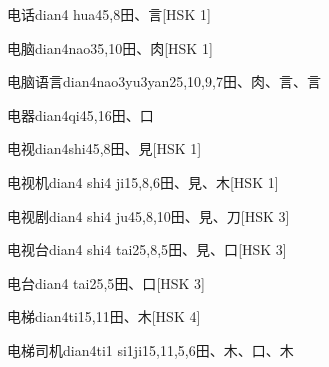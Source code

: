 \begin{entry}{电话}{dian4 hua4}{5,8}{⽥、⾔}[HSK 1]
\end{entry}

\begin{entry}{电脑}{dian4nao3}{5,10}{⽥、⾁}[HSK 1]
\end{entry}

\begin{entry}{电脑语言}{dian4nao3yu3yan2}{5,10,9,7}{⽥、⾁、⾔、⾔}
\end{entry}

\begin{entry}{电器}{dian4qi4}{5,16}{⽥、⼝}
\end{entry}

\begin{entry}{电视}{dian4shi4}{5,8}{⽥、⾒}[HSK 1]
\end{entry}

\begin{entry}{电视机}{dian4 shi4 ji1}{5,8,6}{⽥、⾒、⽊}[HSK 1]
\end{entry}

\begin{entry}{电视剧}{dian4 shi4 ju4}{5,8,10}{⽥、⾒、⼑}[HSK 3]
\end{entry}

\begin{entry}{电视台}{dian4 shi4 tai2}{5,8,5}{⽥、⾒、⼝}[HSK 3]
\end{entry}

\begin{entry}{电台}{dian4 tai2}{5,5}{⽥、⼝}[HSK 3]
\end{entry}

\begin{entry}{电梯}{dian4ti1}{5,11}{⽥、⽊}[HSK 4]
\end{entry}

\begin{entry}{电梯司机}{dian4ti1 si1ji1}{5,11,5,6}{⽥、⽊、⼝、⽊}
\end{entry}

